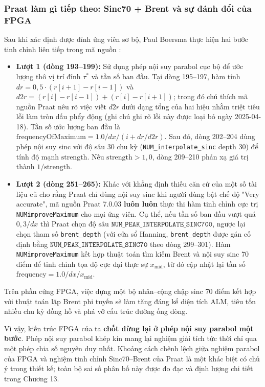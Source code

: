 \subsubsection*{Praat làm gì tiếp theo: Sinc70 + Brent và sự đánh đổi của FPGA}
Sau khi xác định được đỉnh ứng viên sơ bộ, Paul Boersma thực hiện hai bước tinh chỉnh liên tiếp trong mã nguồn :
\begin{itemize}[leftmargin=1.5em, itemsep=2pt]
    \item \textbf{Lượt 1 (dòng 193--199):} Sử dụng phép nội suy parabol cục bộ để ước lượng thô vị trí đỉnh $\tau^*$ và tần số ban đầu. Tại dòng 195--197, hàm tính $dr = 0{,}5 \cdot (r[i+1] - r[i-1])$ và $d2r = (r[i] - r[i-1]) + (r[i] - r[i+1])$; trong đó chú thích mã nguồn Praat nêu rõ việc viết $d2r$ dưới dạng tổng của hai hiệu nhằm triệt tiêu lỗi làm tròn dấu phẩy động (ghi chú ghi rõ lỗi này được loại bỏ ngày 2025-04-18). Tần số ước lượng ban đầu là $\text{frequencyOfMaximum} = 1.0 / dx / (i + dr/d2r)$. Sau đó, dòng 202--204 dùng phép nội suy sinc với độ sâu 30 chu kỳ (\texttt{NUM\_interpolate\_sinc} depth 30) để tính độ mạnh $\text{strength}$. Nếu $\text{strength} > 1{,}0$, dòng 209--210 phản xạ giá trị thành $1/\text{strength}$.
    \item \textbf{Lượt 2 (dòng 251--265):} Khác với khẳng định thiếu căn cứ của một số tài liệu cũ cho rằng Praat chỉ dùng nội suy sinc khi người dùng bật chế độ "Very accurate", mã nguồn Praat 7.0.03 \textbf{luôn luôn} thực thi hàm tinh chỉnh cực trị \texttt{NUMimproveMaximum} cho mọi ứng viên. Cụ thể, nếu tần số ban đầu vượt quá $0{,}3/dx$ thì Praat chọn độ sâu $\texttt{NUM\_PEAK\_INTERPOLATE\_SINC700}$, ngược lại chọn tham số \texttt{brent\_depth} (với cửa sổ Hanning, \texttt{brent\_depth} được gán cố định bằng $\texttt{NUM\_PEAK\_INTERPOLATE\_SINC70}$ theo dòng 299--301). Hàm \texttt{NUMimproveMaximum} kết hợp thuật toán tìm kiếm Brent và nội suy sinc 70 điểm để tinh chỉnh tọa độ cực đại thực sự $x_{\text{mid}}$, từ đó cập nhật lại tần số $\text{frequency} = 1.0 / dx / x_{\text{mid}}$.
\end{itemize}

Trên phần cứng FPGA, việc dựng một bộ nhân--cộng chập sinc 70 điểm kết hợp với thuật toán lặp Brent phi tuyến sẽ làm tăng đáng kể diện tích ALM, tiêu tốn nhiều chu kỳ đồng hồ và phá vỡ cấu trúc đường ống dòng. 

Vì vậy, kiến trúc FPGA của ta \textbf{chốt dừng lại ở phép nội suy parabol một bước}. Phép nội suy parabol khép kín mang lại nghiệm giải tích tức thời chỉ qua một phép chia số nguyên duy nhất. Khoảng cách chênh lệch giữa nghiệm parabol của FPGA và nghiệm tinh chỉnh Sinc70--Brent của Praat là một khác biệt có chủ ý trong thiết kế; toàn bộ sai số phân bố này được đo đạc và định lượng chi tiết trong Chương 13.

